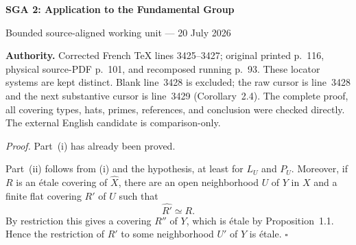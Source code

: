 \documentclass[10pt,a4paper]{article}
\begin{document}
\begin{center}
  {\Large\bfseries SGA 2: Application to the Fundamental Group}\par\smallskip
  {\large Bounded source-aligned working unit --- 20 July 2026}
\end{center}
\noindent\colorbox{softgray}{\parbox{0.95\linewidth}{\footnotesize\textbf{Authority.}
Corrected French TeX lines 3425--3427; original printed p.~116, physical
source-PDF p.~101, and recomposed running p.~93. These locator systems are
kept distinct. Blank line~3428 is excluded; the raw cursor is line~3428 and
the next substantive cursor is line~3429 (Corollary~2.4). The complete proof,
all covering types, hats, primes, references, and conclusion were checked
directly. The external English candidate is comparison-only.}}

\medskip
\noindent\textit{Proof.}
Part~(i) has already been proved.

Part~(ii) follows from (i) and the hypothesis, at least for $L_U$ and $P_U$.
Moreover, if $R$ is an \'{e}tale covering of $\widehat X$, there are an open
neighborhood $U$ of $Y$ in $X$ and a finite flat covering $R'$ of $U$ such
that
\[
  \widehat{R'}\simeq R.
\]
By restriction this gives a covering $R''$ of $Y$, which is \'{e}tale by
Proposition~1.1. Hence the restriction of $R'$ to some neighborhood $U'$ of
$Y$ is \'{e}tale.
\hfill$\square$
\end{document}
